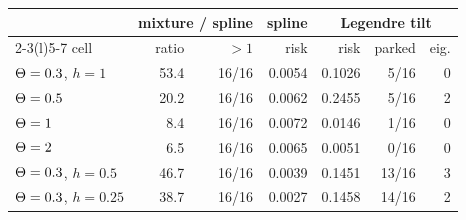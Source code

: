 \begin{tabular}{@{}l r r r r r r@{}}
\toprule
& \multicolumn{2}{c}{mixture / spline} & spline & \multicolumn{3}{c}{Legendre tilt} \\
\cmidrule(lr){2-3}\cmidrule(l){5-7}
cell & ratio & $>1$ & risk & risk & parked & eig. \\
\midrule
$\Theta=0.3$, $h=1$ & 53.4 & 16/16 & 0.0054 & 0.1026 & 5/16 & 0 \\
$\Theta=0.5$ & 20.2 & 16/16 & 0.0062 & 0.2455 & 5/16 & 2 \\
$\Theta=1$ & 8.4 & 16/16 & 0.0072 & 0.0146 & 1/16 & 0 \\
$\Theta=2$ & 6.5 & 16/16 & 0.0065 & 0.0051 & 0/16 & 0 \\
$\Theta=0.3$, $h=0.5$ & 46.7 & 16/16 & 0.0039 & 0.1451 & 13/16 & 3 \\
$\Theta=0.3$, $h=0.25$ & 38.7 & 16/16 & 0.0027 & 0.1458 & 14/16 & 2 \\
\bottomrule
\end{tabular}
